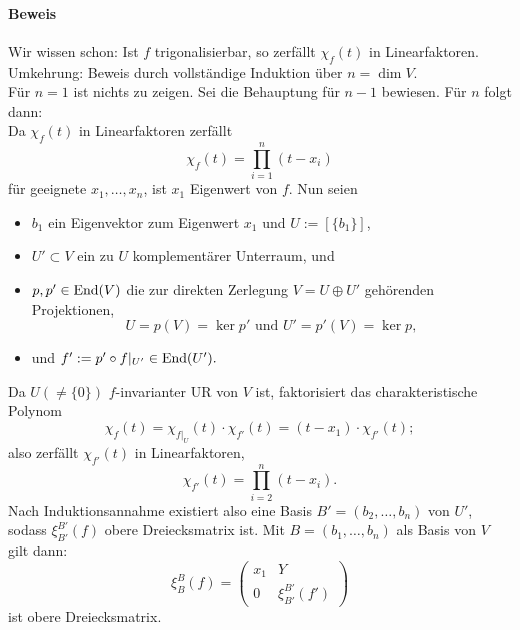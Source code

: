 \paragraph{Beweis}
	Wir wissen schon: Ist $ f $ trigonalisierbar, so zerfällt $ \chi_f(t) $ in Linearfaktoren. Umkehrung: Beweis durch vollständige Induktion über $ n=\dim V $.\\
	Für $ n=1 $ ist nichts zu zeigen. Sei die Behauptung für $ n-1 $ bewiesen. Für $ n $ folgt dann:\\
	Da $ \chi_f(t) $ in Linearfaktoren zerfällt
		\[ \chi_f(t)=\prod_{i=1}^{n}(t-x_i) \]
	für geeignete $ x_1,\dots,x_n $, ist $ x_1 $ Eigenwert von $ f $. Nun seien
	\begin{itemize}
		\item $ b_1 $ ein Eigenvektor zum Eigenwert $ x_1 $ und $ U:= [\{b_1\}] $,
		\item $ U'\subset V $ ein zu $ U $ komplementärer Unterraum, und
		\item $ p,p'\in \operatorname{End}(V) $ die zur direkten Zerlegung $ V = U\oplus U' $ gehörenden Projektionen,
			\[ U = p(V) = \ker p' \text{ und } U' = p'(V) = \ker p, \]
		\item und $ f' := p'\circ f|_{U'}\in\operatorname{End}(U'). $
	\end{itemize}
	Da $ U (\neq \{0\}) $ $ f $-invarianter UR von $ V $ ist, faktorisiert das charakteristische Polynom
		\[ \chi_f(t)=\chi_{f|_U}(t)\cdot \chi_{f'}(t) = (t-x_1)\cdot \chi_{f'}(t); \]
	also zerfällt $ \chi_{f'}(t) $ in Linearfaktoren,
		\[ \chi_{f'}(t)=\prod_{i=2}^{n}(t-x_i). \]
	Nach Induktionsannahme existiert also eine Basis $ B' = (b_2,\dots,b_n) $ von $ U' $, sodass $ \xi_{B'}^{B'}(f) $ obere Dreiecksmatrix ist. Mit $ B=(b_1,\dots,b_n) $ als Basis von $ V $ gilt dann:
		\[ \xi_B^B (f) =
			\begin{pmatrix}
			x_1& Y\\
			0 & \xi_{B'}^{B'}(f')
			\end{pmatrix} \]
	ist obere Dreiecksmatrix.
